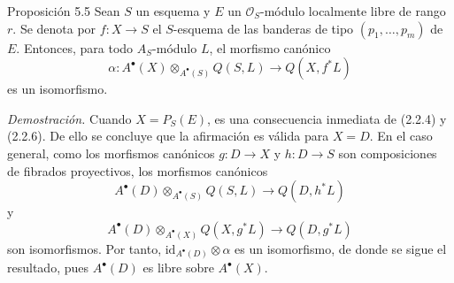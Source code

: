 \begin{statement}{Proposición 5.5}
Sean $S$ un esquema y $E$ un $\mathcal O_S$-módulo localmente libre de rango $r$. Se denota por $f:X\to S$ el $S$-esquema de las banderas de tipo $(p_1,\ldots,p_m)$ de $E$. Entonces, para todo $A_S$-módulo $L$, el morfismo canónico
\[
\alpha:A^\bullet(X)\otimes_{A^\bullet(S)}Q(S,L)\to Q(X,f^*L)
\]
es un isomorfismo.
\end{statement}

\emph{Demostración.} Cuando $X=P_S(E)$, es una consecuencia inmediata de (2.2.4) y (2.2.6). De ello se concluye que la afirmación es válida para $X=D$. En el caso general, como los morfismos canónicos $g:D\to X$ y $h:D\to S$ son composiciones de fibrados proyectivos, los morfismos canónicos
\[
A^\bullet(D)\otimes_{A^\bullet(S)}Q(S,L)\to Q(D,h^*L)
\]
y
\[
A^\bullet(D)\otimes_{A^\bullet(X)}Q(X,g^*L)\to Q(D,g^*L)
\]
son isomorfismos. Por tanto, $\mathrm{id}_{A^\bullet(D)}\otimes\alpha$ es un isomorfismo, de donde se sigue el resultado, pues $A^\bullet(D)$ es libre sobre $A^\bullet(X)$.
